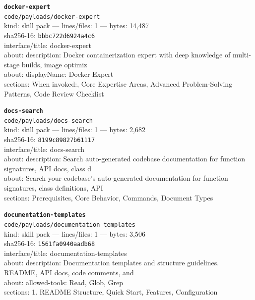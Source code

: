 \noindent\textbf{\texttt{docker-expert}}\\
\texttt{code/payloads/docker-expert}\\
kind: skill pack --- lines/files: 1 --- bytes: 14,487\\
sha256-16: \texttt{bbbc722d6924a4c6}\\
interface/title: docker-expert\\
about: description: Docker containerization expert with deep knowledge of multi-stage builds, image optimiz\\
about: displayName: Docker Expert\\
sections: When invoked:, Core Expertise Areas, Advanced Problem-Solving Patterns, Code Review Checklist\\
\vspace*{6.0pt}

\noindent\textbf{\texttt{docs-search}}\\
\texttt{code/payloads/docs-search}\\
kind: skill pack --- lines/files: 1 --- bytes: 2,682\\
sha256-16: \texttt{8199c89827b61117}\\
interface/title: docs-search\\
about: description: Search auto-generated codebase documentation for function signatures, API docs, class d\\
about: Search your codebase's auto-generated documentation for function signatures, class definitions, API \\
sections: Prerequisites, Core Behavior, Commands, Document Types\\
\vspace*{6.0pt}

\noindent\textbf{\texttt{documentation-templates}}\\
\texttt{code/payloads/documentation-templates}\\
kind: skill pack --- lines/files: 1 --- bytes: 3,506\\
sha256-16: \texttt{1561fa0940aadb68}\\
interface/title: documentation-templates\\
about: description: Documentation templates and structure guidelines. README, API docs, code comments, and \\
about: allowed-tools: Read, Glob, Grep\\
sections: 1. README Structure, Quick Start, Features, Configuration\\
\vspace*{6.0pt}

